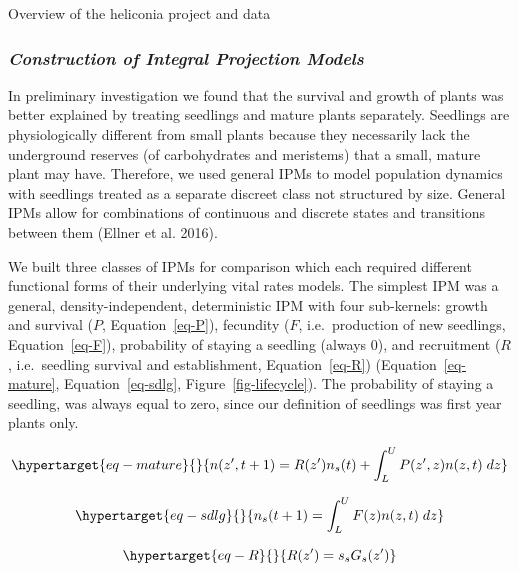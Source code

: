 \documentclass[
  12pt,
]{article}
\begin{document}
Overview of the heliconia project and data

\hypertarget{construction-of-integral-projection-models}{%
\subsubsection{\texorpdfstring{\emph{Construction of Integral Projection
Models}}{Construction of Integral Projection Models}}\label{construction-of-integral-projection-models}}

In preliminary investigation we found that the survival and growth of
plants was better explained by treating seedlings and mature plants
separately. Seedlings are physiologically different from small plants
because they necessarily lack the underground reserves (of carbohydrates
and meristems) that a small, mature plant may have. Therefore, we used
general IPMs to model population dynamics with seedlings treated as a
separate discreet class not structured by size. General IPMs allow for
combinations of continuous and discrete states and transitions between
them (Ellner et al. 2016).

We built three classes of IPMs for comparison which each required
different functional forms of their underlying vital rates models. The
simplest IPM was a general, density-independent, deterministic IPM with
four sub-kernels: growth and survival (\(P\), Equation~\ref{eq-P}),
fecundity (\(F\), i.e.~production of new seedlings,
Equation~\ref{eq-F}), probability of staying a seedling (always 0), and
recruitment (\(R\), i.e.~seedling survival and establishment,
Equation~\ref{eq-R}) (Equation~\ref{eq-mature}, Equation~\ref{eq-sdlg},
Figure~\ref{fig-lifecycle}). The probability of staying a seedling, was
always equal to zero, since our definition of seedlings was first year
plants only.

\begin{equation}\protect\hypertarget{eq-mature}{}{
n(z^{\prime},t+1) = R(z^\prime)n_s(t) + \int_L^U P(z^\prime,z) n(z,t)\;dz
}\label{eq-mature}\end{equation}

\begin{equation}\protect\hypertarget{eq-sdlg}{}{
n_s(t+1) = \int_L^U F(z) n(z,t) \; dz
}\label{eq-sdlg}\end{equation}

\begin{equation}\protect\hypertarget{eq-R}{}{
R(z^\prime) = s_sG_s(z^\prime)
}\label{eq-R}\end{equation}
\end{document}
